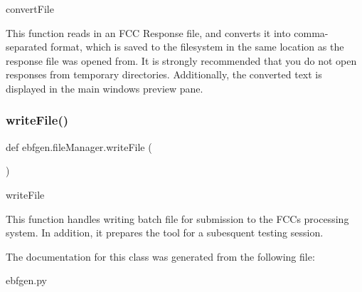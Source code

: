convert\+File 

This function reads in an F\+CC Response file, and converts it into comma-\/separated format, which is saved to the filesystem in the same location as the response file was opened from. It is strongly recommended that you do not open responses from temporary directories. Additionally, the converted text is displayed in the main window\textquotesingle{}s preview pane. \mbox{\label{classebfgen_1_1fileManager_a1d063fa4bd6093f44dd0d1151baa92bc}} 
\subsubsection{\texorpdfstring{write\+File()}{writeFile()}}
{\footnotesize\ttfamily def ebfgen.\+file\+Manager.\+write\+File (\begin{DoxyParamCaption}{ }\end{DoxyParamCaption})}



write\+File 

This function handles writing batch file for submission to the F\+CC\textquotesingle{}s processing system. In addition, it prepares the tool for a subesquent testing session. 

The documentation for this class was generated from the following file\+:\begin{DoxyCompactItemize}
\item 
ebfgen.\+py\end{DoxyCompactItemize}
